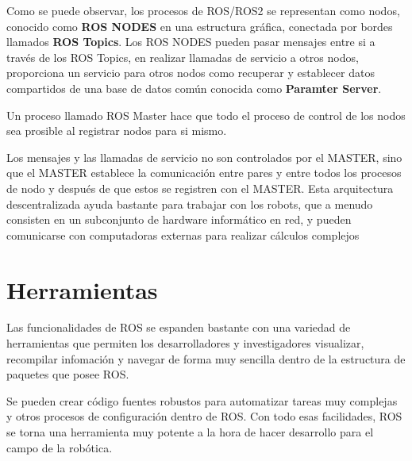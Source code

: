 Como se puede observar, los procesos de ROS/ROS2 se representan como nodos, conocido como \textbf{ROS NODES} en una estructura gráfica, conectada por bordes llamados \textbf{ROS Topics}. Los ROS NODES pueden pasar mensajes entre si a través de los ROS Topics, en realizar llamadas de servicio a otros nodos, proporciona un servicio para otros nodos como recuperar y establecer datos compartidos de una base de datos común conocida como \textbf{Paramter Server}.

Un proceso llamado ROS Master hace que todo el proceso de control de los nodos sea prosible al registrar nodos para si mismo.

Los mensajes y las llamadas de servicio no son controlados por el MASTER, sino que el MASTER establece la comunicación entre pares y entre todos los procesos de nodo y después de que estos se registren con el MASTER. Esta arquitectura descentralizada ayuda bastante para trabajar con los robots, que a menudo consisten en un subconjunto de hardware informático en red, y pueden comunicarse con computadoras externas para realizar cálculos complejos

\section{Herramientas}
Las funcionalidades de ROS se espanden bastante con una variedad de herramientas que permiten los desarrolladores y investigadores visualizar, recompilar infomación y navegar de forma muy sencilla dentro de la estructura de paquetes que posee ROS. 

Se pueden crear código fuentes robustos para automatizar tareas muy complejas y otros procesos de configuración dentro de ROS. Con todo esas facilidades, ROS se torna una herramienta muy potente a la hora de hacer desarrollo para el campo de la robótica. 

